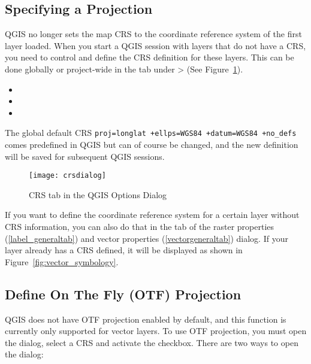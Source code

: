 \subsection{Specifying a Projection}
\label{sec:projection-specifying}

QGIS no longer sets the map CRS to the coordinate reference system of the
first layer loaded. When you start a QGIS session with layers that do not
have a CRS, you need to control and define the CRS definition for these
layers. This can be done globally or project-wide in the  tab under
 >  (See
Figure~\ref{fig:crsdialog}). 

\begin{itemize}
\item {} 
\item {}
\item {}
\end{itemize}

The global default CRS \texttt{proj=longlat +ellps=WGS84 +datum=WGS84
+no\_defs} comes predefined in QGIS but can of course be changed, and the new
definition will be saved for subsequent QGIS sessions.    

\begin{figure}[ht]
   \begin{center}
   \caption{CRS tab in the QGIS Options Dialog \nixcaption}\label{fig:crsdialog}\smallskip
   \texttt{[image: crsdialog]}
\end{center}
\end{figure}

If you want to define the coordinate reference system for a certain layer
without CRS information, you can also do that in the  tab of the
raster properties (\ref{label_generaltab}) and vector properties
(\ref{vectorgeneraltab}) dialog. If your layer already has a CRS defined, it
will be displayed as shown in Figure~\ref{fig:vector_symbology}.

\subsection{Define On The Fly (OTF) Projection}\label{label_projstart}

QGIS does not have OTF projection enabled by default, and this function is
currently only supported for vector layers. To use OTF projection, you must
open the  dialog, select a
CRS and activate the  checkbox.
There are two ways to open the dialog:

